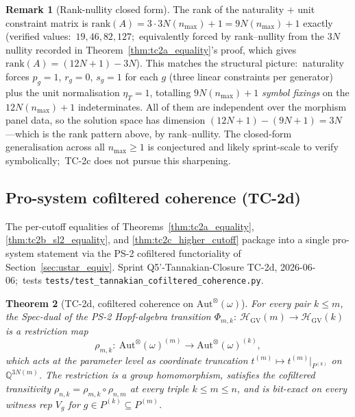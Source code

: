 \documentclass[11pt,a4paper]{article}
\theoremstyle{plain}
\newtheorem{theorem}{Theorem}[section]
\theoremstyle{definition}
\newtheorem{remark}[theorem]{Remark}
\newcommand{\nmax}{n_{\max}}
\newcommand{\HGV}{\mathcal{H}_{\mathrm{GV}}}
\newcommand{\Aut}{\mathrm{Aut}}
\newcommand{\Q}{\mathbb{Q}}
\newcommand{\fibfun}{\omega}
\begin{document}
\begin{remark}[Rank-nullity closed form]\label{rem:tc2c_closed_form}
The rank of the
naturality $+$ unit constraint matrix is
$\mathrm{rank}(A) = 3 \cdot 3 N(\nmax) + 1 = 9N(\nmax)+1$ exactly (verified
values:\ $19, 46, 82, 127$;\ equivalently forced by rank--nullity from the
$3N$ nullity recorded in Theorem~\ref{thm:tc2a_equality}'s proof, which
gives $\mathrm{rank}(A)=(12N+1)-3N$). This matches the structural picture:\
naturality forces $p_{g} = 1$, $r_{g} = 0$, $s_{g} = 1$ for each
$g$ (three linear constraints per generator) plus the unit
normalisation $\eta_{T} = 1$, totalling $9 N(\nmax) + 1$
\emph{symbol fixings} on the $12 N(\nmax) + 1$ indeterminates.  All of them
are independent over the morphism panel data, so the solution space has
dimension $(12N+1)-(9N+1) = 3N$---which is the rank pattern above, by
rank--nullity. The closed-form
generalisation across all $\nmax \ge 1$ is conjectured and likely
sprint-scale to verify symbolically;\ TC-2c does not pursue this
sharpening.
\end{remark}

\subsection{Pro-system cofiltered coherence (TC-2d)}\label{sec:tc2d_cofiltered_coherence}

The per-cutoff equalities of Theorems~\ref{thm:tc2a_equality},
\ref{thm:tc2b_sl2_equality}, and \ref{thm:tc2c_higher_cutoff}
package into a single pro-system statement via the PS-2 cofiltered
functoriality of Section~\ref{sec:ustar_equiv}. Sprint Q5'-Tannakian-Closure
TC-2d, 2026-06-06;\ tests \texttt{tests/test\_tannakian\_cofiltered\_coherence.py}.

\begin{theorem}[TC-2d, cofiltered coherence on $\Aut^{\otimes}(\fibfun)$]\label{thm:tc2d_cofiltered_coherence}
For every pair $k \le m$, the Spec-dual of the PS-2 Hopf-algebra
transition $\Phi_{m, k}:\ \HGV(m) \to \HGV(k)$ is a restriction map
\[
\rho_{m, k}:\ \Aut^{\otimes}(\fibfun)^{(m)}
   \to \Aut^{\otimes}(\fibfun)^{(k)},
\]
which acts at the parameter level as coordinate truncation
$t^{(m)} \mapsto t^{(m)}\big|_{P^{(k)}}$ on $\Q^{3 N(m)}$. The
restriction is a group homomorphism, satisfies the cofiltered
transitivity $\rho_{n, k} = \rho_{m, k} \circ \rho_{n, m}$ at every
triple $k \le m \le n$, and is bit-exact on every witness rep
$V_{g}$ for $g \in P^{(k)} \subseteq P^{(m)}$.
\end{theorem}
\end{document}
